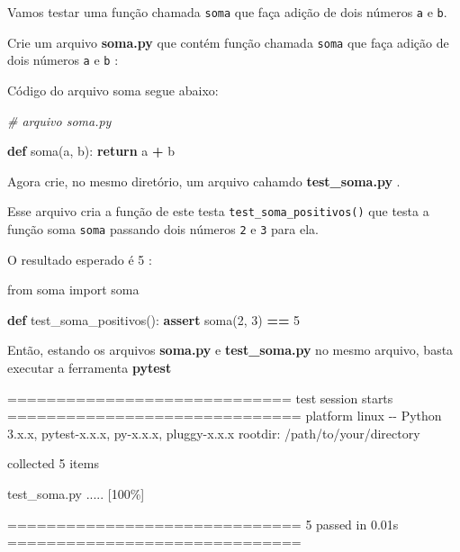 \documentclass[
]{book}
\newenvironment{Shaded}{\begin{snugshade}}{\end{snugshade}}
\newcommand{\AttributeTok}[1]{\textcolor[rgb]{0.13,0.29,0.53}{#1}}
\newcommand{\CommentTok}[1]{\textcolor[rgb]{0.56,0.35,0.01}{\textit{#1}}}
\newcommand{\ControlFlowTok}[1]{\textcolor[rgb]{0.13,0.29,0.53}{\textbf{#1}}}
\newcommand{\DecValTok}[1]{\textcolor[rgb]{0.00,0.00,0.81}{#1}}
\newcommand{\ImportTok}[1]{#1}
\newcommand{\KeywordTok}[1]{\textcolor[rgb]{0.13,0.29,0.53}{\textbf{#1}}}
\newcommand{\NormalTok}[1]{#1}
\newcommand{\OperatorTok}[1]{\textcolor[rgb]{0.81,0.36,0.00}{\textbf{#1}}}
\begin{document}
Vamos testar uma função chamada \texttt{soma} que faça adição de dois números \texttt{a} e \texttt{b}.

Crie um arquivo \textbf{soma.py} que contém função chamada \texttt{soma} que faça adição de dois números \texttt{a} e \texttt{b} :

Código do arquivo soma segue abaixo:

\begin{Shaded}
\begin{Highlighting}[]

\CommentTok{\# arquivo soma.py}


\KeywordTok{def}\NormalTok{ soma(a, b):}
    \ControlFlowTok{return}\NormalTok{ a }\OperatorTok{+}\NormalTok{ b}
\end{Highlighting}
\end{Shaded}

Agora crie, no mesmo diretório, um arquivo cahamdo \textbf{test\_soma.py} .

Esse arquivo cria a função de este testa \texttt{test\_soma\_positivos()} que testa a função soma \texttt{soma} passando dois números \texttt{2} e \texttt{3} para ela.

O resultado esperado é 5 :

\begin{Shaded}
\begin{Highlighting}[]
\ImportTok{from}\NormalTok{ soma }\ImportTok{import}\NormalTok{ soma}

\KeywordTok{def}\NormalTok{ test\_soma\_positivos():}
    \ControlFlowTok{assert}\NormalTok{ soma(}\DecValTok{2}\NormalTok{, }\DecValTok{3}\NormalTok{) }\OperatorTok{==} \DecValTok{5}
    
\end{Highlighting}
\end{Shaded}

Então, estando os arquivos \textbf{soma.py} e \textbf{test\_soma.py} no mesmo arquivo, basta executar a ferramenta \textbf{pytest}

\begin{Shaded}
\begin{Highlighting}[]
\NormalTok{============================= test session starts ==============================}
\NormalTok{platform linux {-}{-} Python 3.x.x, pytest}\AttributeTok{{-}x}\NormalTok{.x.x, py}\AttributeTok{{-}x}\NormalTok{.x.x, pluggy}\AttributeTok{{-}x}\NormalTok{.x.x}
\NormalTok{rootdir: }\AttributeTok{/path/to/your/directory}

\NormalTok{collected 5 items}

\NormalTok{test\_soma.py .....                                                    [100\%]}

\NormalTok{============================== 5 passed in 0.01s ==============================}
\end{Highlighting}
\end{Shaded}
\end{document}
